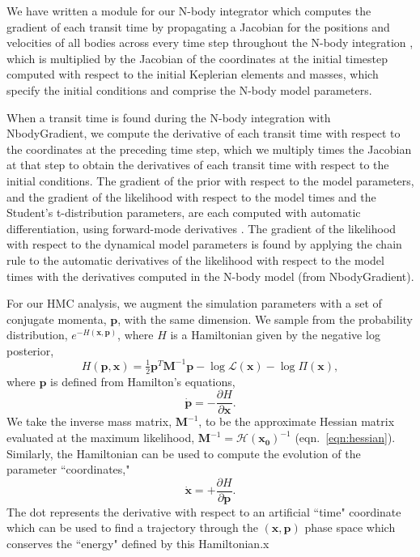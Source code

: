 \documentclass[twocolumn]{aastex63}
\begin{document}
We have written a module for our N-body integrator which computes the
gradient of each transit time by propagating a Jacobian for the positions
and velocities of all bodies across every time step throughout the N-body
integration \citep{Agol2020}, which is multiplied by the Jacobian of the coordinates at the initial timestep computed with respect to the initial Keplerian elements and masses, which specify the initial conditions and comprise the N-body model parameters.  

When a transit time is found during the N-body integration with \textsf{NbodyGradient}, we compute the derivative of each transit time with respect to 
the coordinates at the preceding time step, which we multiply times the Jacobian 
at that step to obtain the derivatives of each transit time with respect to the 
initial conditions. 
The gradient of the prior with respect to the model parameters, and the gradient of the likelihood with respect to the model times and the Student's t-distribution parameters, are each computed with automatic 
differentiation, using forward-mode derivatives  \citep{Revels2016}.  The gradient of the likelihood with
respect to the dynamical model parameters is found by applying the chain rule to the automatic derivatives of the likelihood with respect to the model times with the derivatives computed in the N-body model (from \textsf{NbodyGradient}).


For our HMC analysis, we augment the simulation parameters with a set of conjugate momenta, $\mathbf{p}$, with the same dimension. We sample from the probability distribution, $e^{-H(\mathbf{x},\mathbf{p})}$, where $H$ is a Hamiltonian given by the negative log posterior,
\begin{equation}
    H(\mathbf{p},\mathbf{x}) = \tfrac{1}{2} \mathbf{p}^T \mathbf{M}^{-1} \mathbf{p}
    - \log{\mathcal{L}}(\mathbf{x}) - \log{\Pi(\mathbf{x})},
\end{equation}
where $\mathbf{p}$ is defined from Hamilton's equations,
\begin{equation}
    \dot{\mathbf{p}} = -\frac{\partial H}{\partial \mathbf{x}}.
\end{equation}
We take the inverse mass matrix, $\mathbf{M}^{-1}$, to be the approximate Hessian matrix evaluated at the maximum likelihood, $\mathbf{M}^{-1} = \mathbf{\mathcal{H}(\mathbf{x}_0)}^{-1}$ (eqn.\ \ref{eqn:hessian}).
Similarly, the Hamiltonian can be used to compute the evolution of the parameter ``coordinates,"
\begin{equation}
    \dot{\mathbf{x}} = +\frac{\partial H}{\partial \mathbf{p}}.
\end{equation}
The dot represents the derivative with respect to an artificial ``time" coordinate which can be used to find a trajectory through the $(\mathbf{x},\mathbf{p})$ phase space which conserves the ``energy" defined by this Hamiltonian.x
\end{document}
